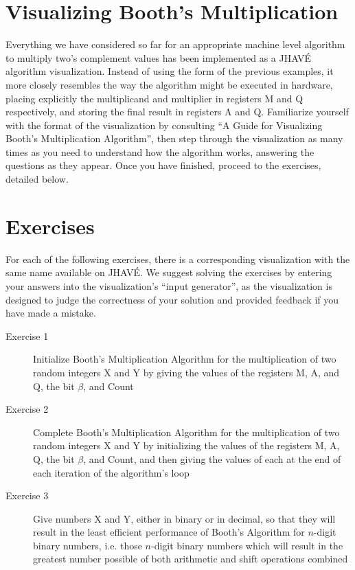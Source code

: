 \documentclass{article}
\begin{document}
\section{Visualizing Booth's Multiplication}
Everything we have considered so far for an appropriate machine level algorithm to multiply two's complement values has been implemented as a JHAVÉ algorithm visualization.
Instead of using the form of the previous examples, it more closely resembles the way the algorithm might be executed in hardware, placing explicitly the multiplicand and multiplier in registers M and Q respectively, and storing the final result in registers A and Q.
Familiarize yourself with the format of the visualization by consulting ``A Guide for Visualizing Booth’s Multiplication Algorithm'', then step through the visualization as many times as you need to understand how the algorithm works, answering the questions as they appear.
Once you have finished, proceed to the exercises, detailed below.

\section{Exercises}
For each of the following exercises, there is a corresponding visualization with the same name available on JHAVÉ.
We suggest solving the exercises by entering your answers into the visualization's ``input generator'', as the visualization is designed to judge the correctness of your solution and provided feedback if you have made a mistake.

\begin{description}
    \item [Exercise 1] Initialize Booth's Multiplication Algorithm for the multiplication of two random integers X and Y by giving the values of the registers M, A, and Q, the bit $\beta$, and Count
    \item [Exercise 2] Complete Booth's Multiplication Algorithm for the multiplication of two random integers X and Y by initializing the values of the registers M, A, Q, the bit $\beta$, and Count, and then giving the values of each at the end of each iteration of the algorithm's loop
    \item [Exercise 3] Give numbers X and Y, either in binary or in decimal, so that they will result in the least efficient performance of Booth's Algorithm for $n$-digit binary numbers, i.e. those $n$-digit binary numbers which will result in the greatest number possible of both arithmetic and shift operations combined
\end{description}
\end{document}
